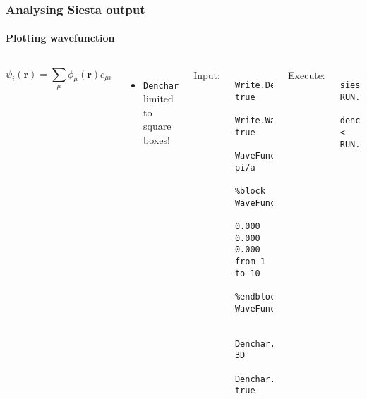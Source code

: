 \begin{frame}[fragile]
  \frametitle{Analysing Siesta output}
  \framesubtitle{Plotting wavefunction}

  \begin{columns}

    \begin{equation*}
    \psi_i(\mathbf r) = \sum_{\mu} \phi_\mu(\mathbf r)c_{\mu i}
  \end{equation*}

  \begin{itemize}
    \item \texttt{Denchar} limited to square boxes!
  \end{itemize}

  \footnotesize
  Input:
\begin{verbatim}
  Write.Denchar true
  Write.WaveFunctions true
  WaveFuncKPointsScale pi/a
  %block WaveFuncKPoints
    0.000 0.000 0.000 from 1 to 10
  %endblock WaveFuncKPoints

  Denchar.TypeOfRun 3D
  Denchar.PlotWaveFunctions true
\end{verbatim}
  Execute:
\begin{verbatim}
  siesta RUN.fdf
  denchar < RUN.fdf
\end{verbatim}


  
\end{columns}
  
\end{frame}
